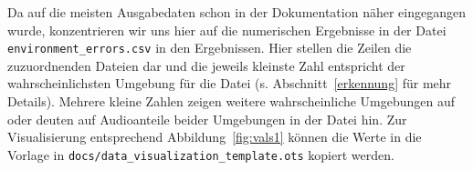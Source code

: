 \documentclass[
	fontsize=10.5pt,
	marginpar=false,
	ngerman,
	accentcolor=3d
	]{tudapub}
\begin{document}
Da auf die meisten Ausgabedaten schon in der Dokumentation näher eingegangen wurde, konzentrieren wir uns hier auf die numerischen Ergebnisse in der Datei \texttt{environment\_errors.csv} in den Ergebnissen. Hier stellen die Zeilen die zuzuordnenden Dateien dar und die jeweils kleinste Zahl entspricht der wahrscheinlichsten Umgebung für die Datei (s. Abschnitt~\ref{erkennung} für mehr Details). Mehrere kleine Zahlen zeigen weitere wahrscheinliche Umgebungen auf oder deuten auf Audioanteile beider Umgebungen in der Datei hin. Zur Visualisierung entsprechend Abbildung~\ref{fig:vals1} können die Werte in die Vorlage in \texttt{docs/data\_visualization\_template.ots} kopiert werden.

\appendix




\pagebreak
\printbibliography


\end{document}
